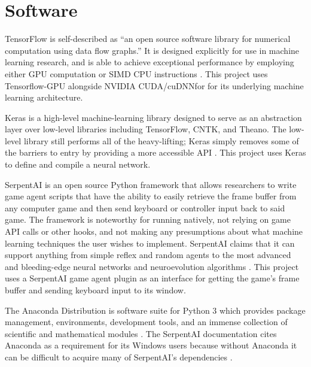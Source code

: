 


\section{Software}

TensorFlow is self-described as ``an open source software library for numerical computation using data flow graphs.'' It is designed explicitly for use in machine learning research, and is able to achieve exceptional performance by employing either GPU computation or SIMD CPU instructions \cite{TensorFlow}. This project uses Tensorflow-GPU alongside NVIDIA CUDA/cuDNNfor for its underlying machine learning architecture.

Keras is a high-level machine-learning library designed to serve as an abstraction layer over low-level libraries including TensorFlow, CNTK, and Theano. The low-level library still performs all of the heavy-lifting; Keras simply removes some of the barriers to entry by providing a more accessible API \cite{Keras}. This project uses Keras to define and compile a neural network.

SerpentAI is an open source Python framework that allows researchers to write game agent scripts that have the ability to easily retrieve the frame buffer from any computer game and then send keyboard or controller input back to said game. The framework is noteworthy for running natively, not relying on game API calls or other hooks, and not making any presumptions about what machine learning techniques the user wishes to implement. SerpentAI claims that it can support anything from simple reflex and random agents to the most advanced and bleeding-edge neural networks and neuroevolution algorithms \cite{SerpentAI}. This project uses a SerpentAI game agent plugin as an interface for getting the game's frame buffer and sending keyboard input to its window.

The Anaconda Distribution is software suite for Python 3 which provides package management, environments, development tools, and an immense collection of scientific and mathematical modules \cite{Anaconda}. The SerpentAI documentation cites Anaconda as a requirement for its Windows users because without Anaconda it can be difficult to acquire many of SerpentAI's dependencies \cite{SerpentAI}.





